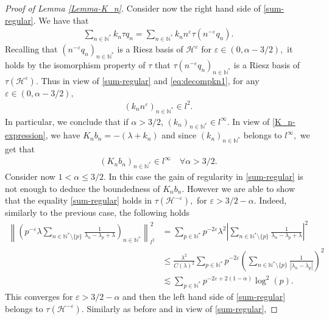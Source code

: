 \documentclass[11pt, dvipsnames]{amsart}
\begin{document}
{\begin{proof}[Proof of Lemma \ref{Lemma-K_n}]
Consider now the right hand side of \eqref{sum-regular}. We have that
\begin{align}
\label{eq:decompkn1}
   \sum_{n\in \mathbb{N}^*}k_{n}\tau q_{n}=\sum_{n\in \mathbb{N}^*}k_{n}n^{\varepsilon}\tau(n^{-\varepsilon} q_{n}). 
\end{align} 
Recalling that $(n^{-\varepsilon} q_{n})_{n\in \mathbb{N}^*}$ is a Riesz basis of $\mathcal{H}^{\varepsilon}$ for $\varepsilon \in (0,\alpha-3/2),$ it holds by the isomorphism property of $\tau$ that $\tau(n^{-\varepsilon} q_{n})_{n\in \mathbb{N}^*}$ is a Riesz basis of $\tau(\mathcal{H}^{\varepsilon}).$ Thus in view of \eqref{sum-regular} and \eqref{eq:decompkn1}, 
for any $\varepsilon \in (0,\alpha-3/2),$
\begin{align*}
    (k_n n^{\varepsilon})_{n\in \mathbb{N}^*}\in l^2.
\end{align*} 
In particular, we conclude that if $\alpha>3/2$, $(k_n)_{n\in \mathbb{N}^*}\in l^{\infty}.$
In view of \eqref{K_n-expression}, we have $K_n b_n=-(\lambda+k_n)$ and since $(k_n)_{n\in \mathbb{N}^*}$ belongs to $l^{\infty},$ we get that 
\begin{align}
    (K_n b_n)_{n\in \mathbb{N}^*}\in l^{\infty}\quad  \forall \alpha>3/2.\label{Kn-l-infty1}
\end{align} 
Consider now $1<\alpha\leq 3/2.$ In this case the gain of regularity in \eqref{sum-regular} is not enough to deduce the boundedness of $K_n b_n.$ However we are able to show that the equality \eqref{sum-regular} holds in $\tau(\mathcal{H}^{-\varepsilon}),$ for $\varepsilon>3/2-\alpha.$ Indeed, similarly to the previous case, the following holds
\begin{align*}
    \left\|\left(p^{-\varepsilon}\lambda\displaystyle\sum_{n\in \mathbb{N}^*\setminus\{p\}}\frac{1}{\lambda_n-\lambda_p+\lambda}\right)_{n\in \mathbb{N}^*}\right\|^2_{l^2}&=\sum_{p\in \mathbb{N}^*}p^{-2\varepsilon}\lambda^2\left|\displaystyle\sum_{n\in \mathbb{N}^*\setminus\{p\}}\frac{1}{\lambda_n-\lambda_p+\lambda}\right|^2\\
    &\leq \frac{\lambda^2}{C(\lambda)^2}\sum_{p\in \mathbb{N}^*}p^{-2\varepsilon}\left(\displaystyle\sum_{n\in \mathbb{N}^*\setminus\{p\}}\frac{1}{|\lambda_n-\lambda_p|}\right)^2\\
    &\lesssim\sum_{p\in \mathbb{N}^*} p^{-2\varepsilon+2(1-\alpha)}\log^2(p).
\end{align*} This converges for $\varepsilon>3/2-\alpha$ and then the left hand side of \eqref{sum-regular} belongs to $\tau(\mathcal{H}^{-\varepsilon}).$ 
Similarly as before and in view of \eqref{sum-regular}, 

\end{proof}}
\end{document}
